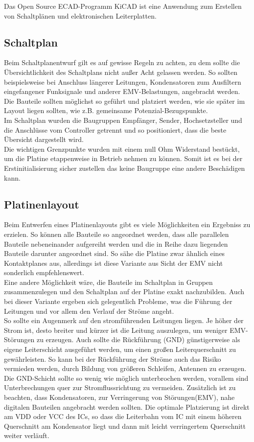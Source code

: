 
Das Open Source ECAD-Programm KiCAD ist eine Anwendung zum Erstellen von Schaltplänen und elektronischen Leiterplatten. 

\subsection{Schaltplan}
Beim Schaltplanentwurf gilt es auf gewisse Regeln zu achten, zu dem sollte die Übersichtlichkeit des Schaltplans nicht außer Acht gelassen werden.
So sollten beispielsweise bei Anschluss längerer Leitungen, Kondensatoren zum Ausfiltern eingefangener Funksignale und anderer EMV-Belastungen, angebracht werden. Die Bauteile sollten möglichst so geführt und platziert werden, wie sie später im Layout liegen sollten, wie z.B. gemeinsame Potenzial-Bezugspunkte.\\
Im Schaltplan wurden die Baugruppen Empfänger, Sender, Hochsetzsteller und die Anschlüsse vom Controller getrennt und so positioniert, dass die beste Übersicht dargestellt wird.\\
Die wichtigen Grenzpunkte wurden mit einem null Ohm Widerstand bestückt, um die Platine etappenweise in Betrieb nehmen zu können. Somit ist es bei der Erstinitialisierung
sicher zustellen das keine Baugruppe eine andere Beschädigen kann. \\   

\subsection{Platinenlayout}
Beim Entwerfen eines Platinenlayouts gibt es viele Möglichkeiten ein Ergebniss zu erzielen. So können alle Bauteile so angeordnet werden, dass alle parallelen Bauteile nebeneinander aufgereiht werden und die in Reihe dazu liegenden Bauteile darunter angeordnet sind. So sähe die Platine zwar ähnlich eines Kontaktplanes aus, allerdings ist diese Variante aus Sicht der EMV nicht sonderlich empfehlenswert.\\
Eine andere Möglichkeit wäre, die Bauteile im Schaltplan in Gruppen zusammenzulegen und den Schaltplan auf der Platine exakt nachzubilden. Auch bei dieser Variante ergeben sich gelegentlich Probleme, was die Führung der Leitungen und vor allem den Verlauf der Ströme angeht.\\
So sollte ein Augenmerk auf den stromführenden Leitungen liegen. Je höher der Strom ist, desto breiter und kürzer ist die Leitung auszulegen, um weniger EMV-Störungen zu erzeugen. Auch sollte die Rückführung (GND) günstigerweise als eigene Leiterschicht ausgeführt werden, um einen großen Leiterquerschnitt zu gewährleisten. So kann bei der Rückführung der Ströme auch das Risiko vermieden werden, durch Bildung von größeren Schleifen, Antennen zu erzeugen. Die GND-Schicht sollte so wenig wie möglich unterbrochen werden, vorallem sind Unterbrechungen quer zur Stromflussrichtung zu vermeiden. Zusätzlich ist zu beachten, dass Kondensatoren, zur Verringerung von Störungen(EMV), nahe digitalen Bauteilen angebracht werden sollten. Die optimale Platzierung ist direkt am VDD oder VCC des ICs, so dass die Leiterbahn vom IC mit einem höheren Querschnitt am Kondensator liegt und dann mit leicht verringertem Querschnitt weiter verläuft.


